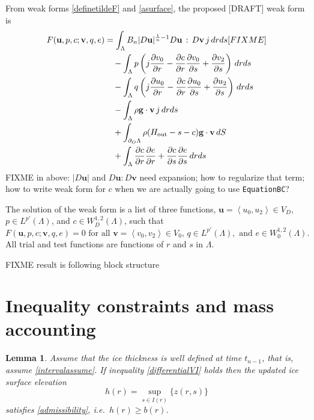 \documentclass[letterpaper,final,12pt,reqno]{amsart}
\newcommand{\bg}{\mathbf{g}}
\newcommand{\bu}{\mathbf{u}}
\newcommand{\bv}{\mathbf{v}}
\newtheorem{lemma}{Lemma}
\begin{document}
From weak forms \eqref{definetildeF} and \eqref{asurface}, the proposed [DRAFT] weak form is
\begin{align}
F(\bu,p,c;\bv,q,e) &= \int_\Lambda B_n |D\bu|^{\frac{1}{n} - 1} D\bu\,:\,D\bv\, j\,dr ds [FIXME] \label{defineF} \\
    &\quad  - \int_\Lambda p \left(j \frac{\partial v_0}{\partial r} - \frac{\partial c}{\partial r} \frac{\partial v_0}{\partial s} + \frac{\partial v_2}{\partial s}\right) \,dr ds \notag \\
    &\quad - \int_\Lambda q \left(j \frac{\partial u_0}{\partial r} - \frac{\partial c}{\partial r} \frac{\partial u_0}{\partial s} + \frac{\partial u_2}{\partial s}\right)\,dr ds \notag \\
    &\quad  - \int_\Lambda \rho \mathbf{g} \cdot \bv \, j\,dr ds \notag \\
    &\quad + \int_{\partial_O \Lambda} \rho (H_{\text{out}}-s-c) \bg \cdot \bv \,dS \notag \\
    &\quad + \int_\Lambda \frac{\partial c}{\partial r} \frac{\partial e}{\partial r} + \frac{\partial c}{\partial s} \frac{\partial e}{\partial s}\,dr ds \notag
\end{align}
FIXME in above: $|D\bu|$ and $D\bu:D\bv$ need expansion; how to regularize that term; how to write weak form for $c$ when we are actually going to use \texttt{EquationBC}?

The solution of the weak form is a list of three functions, $\bu = \left<u_0,u_2\right> \in V_D$, $p\in L^{p'}(\Lambda)$, and $c\in W^{1,2}_D(\Lambda)$, such that
\begin{equation}
F(\bu,p,c;\bv,q,e) = 0 \text{ for all } \bv = \left<v_0,v_2\right> \in V_0, \, q\in L^{p'}(\Lambda), \text{ and } e \in W^{1,2}_0(\Lambda).
\end{equation}
All trial and test functions are functions of $r$ and $s$ in $\Lambda$.

FIXME result is following block structure


\section{Inequality constraints and mass accounting} \label{sec:inequalities}

\begin{lemma}
Assume that the ice thickness is well defined at time $t_{n-1}$, that is, assume
\eqref{intervalassume}.  If inequality \eqref{differentialVI} holds then the updated ice surface elevation
    $$h(r) = \sup_{s\in I(r)}\{z(r,s)\}$$
satisfies \eqref{admissibility}, i.e.~$h(r)\ge b(r)$.
\end{lemma}
\end{document}
